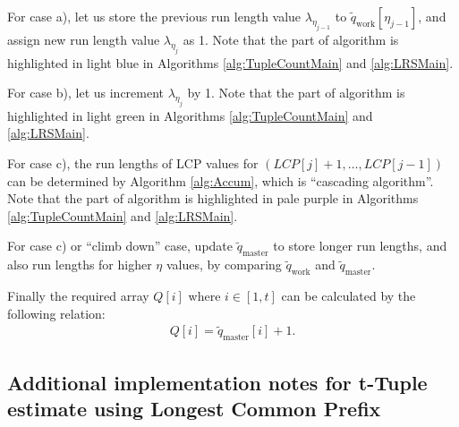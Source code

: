 ﻿\documentclass[a3paper,xelatex,english]{bxjsarticle}
\begin{document}
For case a), let us store the previous run length value $\lambda_{\eta_{j-1}}$ to $\tilde{q}_{\textrm{work}}[\eta_{j - 1}]$, and assign new run length value $\lambda_{\eta_{j}}$ as 1.
Note that the part of algorithm is highlighted in \colorbox{hlblue!25}{light blue} in Algorithms \ref{alg:TupleCountMain} and \ref{alg:LRSMain}.

For case b), let us increment $\lambda_{\eta_{j}}$ by 1.
Note that the part of algorithm is highlighted in  \colorbox{Pomme!10}{light green} in Algorithms \ref{alg:TupleCountMain} and \ref{alg:LRSMain}.

For case c), the run lengths of LCP values for $(LCP[j] + 1, \ldots, LCP[j - 1])$ can be determined by Algorithm \ref{alg:Accum}, which is ``cascading algorithm''.
Note that the part of algorithm is highlighted in  \colorbox{Heliotrope!10}{pale purple} in Algorithms \ref{alg:TupleCountMain} and \ref{alg:LRSMain}.

For case c) or ``climb down'' case, update $\tilde{q}_{\textrm{master}}$ to store longer run lengths, and also run lengths for higher $\eta$ values, by comparing $\tilde{q}_{\textrm{work}}$ and $\tilde{q}_{\textrm{master}}$.

Finally the required array $Q[i]$ where $i \in [1, t]$ can be calculated by the following relation:
\begin{align}
Q[i] = \tilde{q}_{\textrm{master}}[i] + 1.
\end{align}

\clearpage
\subsection{Additional implementation notes for t-Tuple estimate using Longest Common Prefix}
\end{document}
